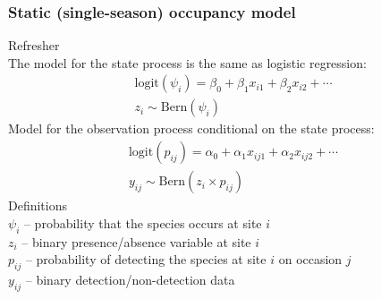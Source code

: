 \documentclass[color=usenames,dvipsnames]{beamer}\usepackage[]{graphicx}\usepackage[]{color}
\begin{document}



\begin{frame}
  \frametitle{Static (single-season) occupancy model}
  {\centering \color{blue} Refresher \\}
  \vfill
  \small
  The model for the state process is the same as logistic regression:
  \begin{gather*}
    \mathrm{logit}(\psi_i) = \beta_0 + \beta_1 x_{i1} + \beta_2 x_{i2} + \cdots \\
    z_i \sim \mathrm{Bern}(\psi_i)
  \end{gather*}
  \pause
  \vfill
  Model for the observation process conditional on the state process:
  \begin{gather*}
    \mathrm{logit}(p_{ij}) = \alpha_0 + \alpha_1 x_{ij1} + \alpha_2 x_{ij2} + \cdots \\
    y_{ij} \sim \mathrm{Bern}(z_i\times p_{ij})
  \end{gather*}
  \pause
  Definitions \\
  $\psi_i$ -- probability that the species occurs at site $i$ \\
  $z_i$ -- binary presence/absence variable at site $i$ \\
  $p_{ij}$ -- probability of detecting the species at site $i$ on occasion $j$ \\
  $y_{ij}$ -- binary detection/non-detection data
\end{frame}
\end{document}
